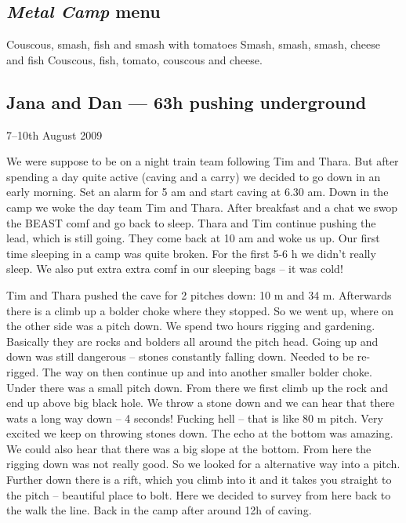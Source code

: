
\hypertarget{metal-camp-menu}{%
\subsection{\texorpdfstring{\emph{Metal Camp}
menu}{Metal Camp menu}}\label{metal-camp-menu}}

Couscous, smash, fish and smash with tomatoes Smash, smash, smash,
cheese and fish Couscous, fish, tomato, couscous and cheese.


\hypertarget{jana-and-dan-63h-pushing-underground}{%
\subsection{Jana and Dan --- 63h pushing
underground}\label{jana-and-dan-63h-pushing-underground}}

7--10th August 2009

We were suppose to be on a night train team following Tim and Thara. But
after spending a day quite active (caving and a carry) we decided to go
down in an early morning. Set an alarm for 5 am and start caving at 6.30
am. Down in the camp we woke the day team Tim and Thara. After breakfast
and a chat we swop the BEAST comf and go back to sleep. Thara and Tim
continue pushing the lead, which is still going. They come back at 10 am
and woke us up. Our first time sleeping in a camp was quite broken. For
the first 5-6 h we didn't really sleep. We also put extra extra comf in
our sleeping bags -- it was cold!

Tim and Thara pushed the cave for 2 pitches down: 10 m and 34 m.
Afterwards there is a climb up a bolder choke where they stopped. So we
went up, where on the other side was a pitch down. We spend two hours
rigging and gardening. Basically they are rocks and bolders all around
the pitch head. Going up and down was still dangerous -- stones
constantly falling down. Needed to be re-rigged. The way on then
continue up and into another smaller bolder choke. Under there was a
small pitch down. From there we first climb up the rock and end up above
big black hole. We throw a stone down and we can hear that there wats a
long way down -- 4 seconds! Fucking hell -- that is like 80 m pitch.
Very excited we keep on throwing stones down. The echo at the bottom was
amazing. We could also hear that there was a big slope at the bottom.
From here the rigging down was not really good. So we looked for a
alternative way into a pitch. Further down there is a rift, which you
climb into it and it takes you straight to the pitch -- beautiful place
to bolt. Here we decided to survey from here back to the walk the line.
Back in the camp after around 12h of caving.


